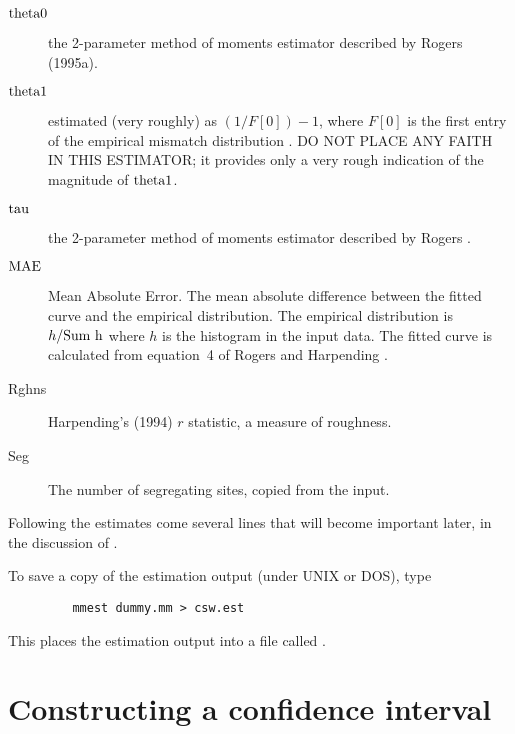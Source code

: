 \begin{description}
\item[$\hbox{theta0}$]the 2-parameter method of moments estimator described by
          Rogers (1995a).
\item[$\hbox{theta1}$]estimated (very roughly) as $(1/F[0]) - 1$, where
      $F[0]$ is the first entry of the empirical mismatch distribution
      \cite{Rogers:MBE-9-552}. DO NOT PLACE ANY FAITH IN THIS
          ESTIMATOR; it provides only a very rough indication of the 
          magnitude of $\hbox{theta1}$.  
\item[$\hbox{tau}$]the 2-parameter method of moments estimator described by
          Rogers \cite{Rogers:E-49-608}.
\item[$\hbox{MAE}$] Mean Absolute Error.  The mean absolute difference
      between the fitted curve and the empirical distribution.  The
          empirical distribution is $h/\hbox{Sum h}$ where $h$ is the histogram
          in the input data.  The fitted curve is calculated from
          equation~4 of Rogers and Harpending \cite{Rogers:MBE-9-552}. 
\item[Rghns]Harpending's (1994) $r$ statistic, a measure of roughness.
\item[Seg]The number of segregating sites, copied from the input.
\end{description}
Following the estimates come several lines that will become important
later, in the discussion of .

To save a copy of the estimation output (under UNIX or DOS), type
\begin{verbatim}
         mmest dummy.mm > csw.est
\end{verbatim}
This places the estimation output into a file called .

\section{Constructing a confidence interval}

